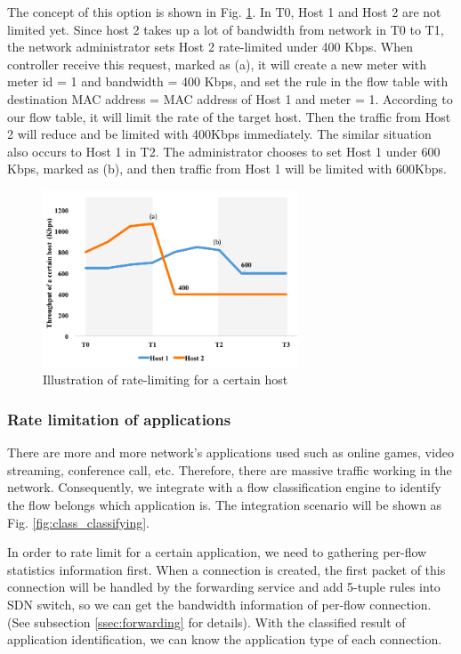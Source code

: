\documentclass[journal]{IEEEtran}
\begin{document}
The concept of this option is shown in Fig. \ref{fig:mft_qos_rate_host}. In T0, Host 1 and Host 2 are not limited yet. Since host 2 takes up a lot of bandwidth from network in T0 to T1, the network administrator sets Host 2 rate-limited under 400 Kbps. When controller receive this request, marked as (a), it will create a new meter with meter id = 1 and bandwidth = 400 Kbps, and set the rule in the flow table with destination MAC address = MAC address of Host 1 and meter = 1. According to our flow table, it will limit the rate of the target host. Then the traffic from Host 2 will reduce and be limited with 400Kbps immediately. The similar situation also occurs to Host 1 in T2. The administrator chooses to set Host 1 under 600 Kbps, marked as (b), and then traffic from Host 1 will be limited with 600Kbps.


\begin{figure}[!t]
\centering
\includegraphics[width=3in]{./figures/mft_qos_rate_host}
\caption{Illustration of rate-limiting for a certain host}
\label{fig:mft_qos_rate_host}
\end{figure}


\subsubsection{Rate limitation of applications}
There are more and more network’s applications used such as online games, video streaming, conference call, etc. Therefore, there are massive traffic working in the network. Consequently, we integrate with a flow classification engine to identify the flow belongs which application is. The integration scenario will be shown as Fig. \ref{fig:class_classifying}.


In order to rate limit for a certain application, we need to gathering per-flow statistics information first. When
a connection is created, the first packet of this connection will be handled by the forwarding service and add 5-tuple rules into SDN switch, so we can get the bandwidth information of per-flow connection. (See subsection \ref{ssec:forwarding} for details). With the classified result of application identification, we can know the application type of each connection.
\end{document}
